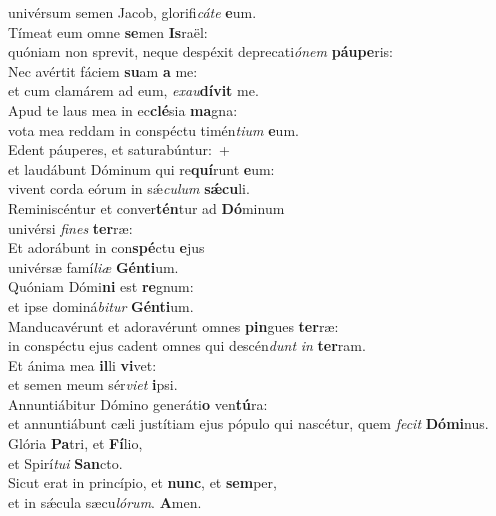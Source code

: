 \evenverse univérsum semen Jacob, glorifi\textit{cá}\textit{te} \textbf{e}um.\\
\oddverse Tímeat eum omne \textbf{se}men \textbf{Is}raël:~\*\\
\oddverse quóniam non sprevit, neque despéxit deprecati\textit{ó}\textit{nem} \textbf{páu}\textbf{pe}ris:\\
\evenverse Nec avértit fáciem \textbf{su}am \textbf{a} me:~\*\\
\evenverse et cum clamárem ad eum, \textit{e}\textit{xau}\textbf{dí}\textbf{vit} me.\\
\oddverse Apud te laus mea in ec\textbf{clé}sia \textbf{ma}gna:~\*\\
\oddverse vota mea reddam in conspéctu timén\textit{ti}\textit{um} \textbf{e}um.\\
\evenverse Edent páuperes, et saturabúntur:~+\\
\evenverse  et laudábunt Dóminum qui re\textbf{quí}runt \textbf{e}um:~\*\\
\evenverse vivent corda eórum in sǽ\textit{cu}\textit{lum} \textbf{sǽ}\textbf{cu}li.\\
\oddverse Reminiscéntur et conver\textbf{tén}tur ad \textbf{Dó}minum~\*\\
\oddverse univérsi \textit{fi}\textit{nes} \textbf{ter}ræ:\\
\evenverse Et adorábunt in con\textbf{spé}ctu \textbf{e}jus~\*\\
\evenverse univérsæ famí\textit{li}\textit{æ} \textbf{Gén}\textbf{ti}um.\\
\oddverse Quóniam Dómi\textbf{ni} est \textbf{re}gnum:~\*\\
\oddverse et ipse dominá\textit{bi}\textit{tur} \textbf{Gén}\textbf{ti}um.\\
\evenverse Manducavérunt et adoravérunt omnes \textbf{pin}gues \textbf{ter}ræ:~\*\\
\evenverse in conspéctu ejus cadent omnes qui descén\textit{dunt} \textit{in} \textbf{ter}ram.\\
\oddverse Et ánima mea \textbf{il}li \textbf{vi}vet:~\*\\
\oddverse et semen meum sér\textit{vi}\textit{et} \textbf{i}psi.\\
\evenverse Annuntiábitur Dómino generáti\textbf{o} ven\textbf{tú}ra:~\*\\
\evenverse et annuntiábunt cæli justítiam ejus pópulo qui nascétur, quem \textit{fe}\textit{cit} \textbf{Dó}\textbf{mi}nus.\\
\oddverse Glória \textbf{Pa}tri, et \textbf{Fí}lio,~\*\\
\oddverse et Spirí\textit{tu}\textit{i} \textbf{San}cto.\\
\evenverse Sicut erat in princípio, et \textbf{nunc}, et \textbf{sem}per,~\*\\
\evenverse et in sǽcula sæcu\textit{ló}\textit{rum}. \textbf{A}men.\\
